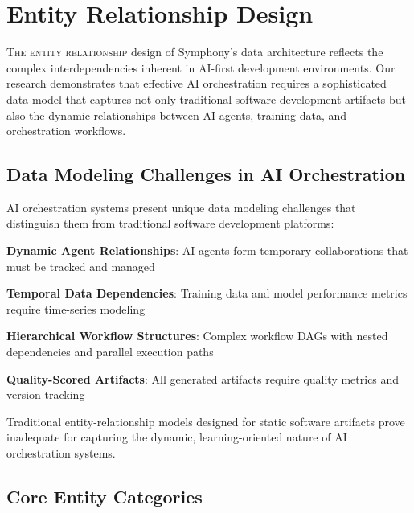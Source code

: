 
\section*{Entity Relationship Design}

\lettrine{T}{he entity relationship} design of Symphony's data architecture reflects the complex interdependencies inherent in AI-first development environments. Our research demonstrates that effective AI orchestration requires a sophisticated data model that captures not only traditional software development artifacts but also the dynamic relationships between AI agents, training data, and orchestration workflows.

\subsection*{Data Modeling Challenges in AI Orchestration}

AI orchestration systems present unique data modeling challenges that distinguish them from traditional software development platforms:

\begin{expandedlist}
    \item \textbf{Dynamic Agent Relationships}: AI agents form temporary collaborations that must be tracked and managed
    \item \textbf{Temporal Data Dependencies}: Training data and model performance metrics require time-series modeling
    \item \textbf{Hierarchical Workflow Structures}: Complex workflow DAGs with nested dependencies and parallel execution paths
    \item \textbf{Quality-Scored Artifacts}: All generated artifacts require quality metrics and version tracking
\end{expandedlist}

Traditional entity-relationship models designed for static software artifacts prove inadequate for capturing the dynamic, learning-oriented nature of AI orchestration systems.

\subsection*{Core Entity Categories}

